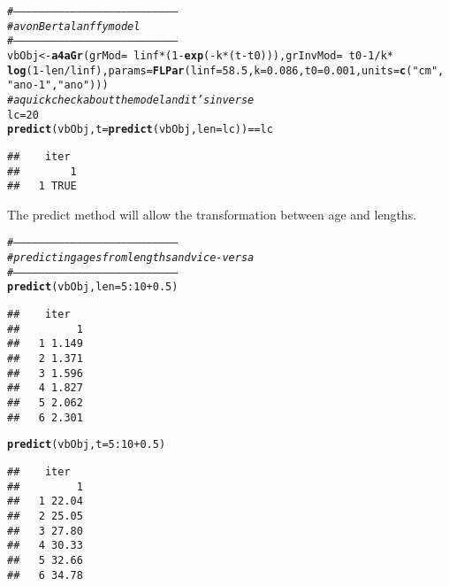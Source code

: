 \documentclass[a4paper,english,10pt]{article}\usepackage[]{graphicx}\usepackage[]{color}
\makeatletter
\newcommand{\hlnum}[1]{\textcolor[rgb]{0.686,0.059,0.569}{#1}}%
\newcommand{\hlstr}[1]{\textcolor[rgb]{0.192,0.494,0.8}{#1}}%
\newcommand{\hlcom}[1]{\textcolor[rgb]{0.678,0.584,0.686}{\textit{#1}}}%
\newcommand{\hlopt}[1]{\textcolor[rgb]{0,0,0}{#1}}%
\newcommand{\hlstd}[1]{\textcolor[rgb]{0.345,0.345,0.345}{#1}}%
\newcommand{\hlkwb}[1]{\textcolor[rgb]{0.69,0.353,0.396}{#1}}%
\newcommand{\hlkwc}[1]{\textcolor[rgb]{0.333,0.667,0.333}{#1}}%
\newcommand{\hlkwd}[1]{\textcolor[rgb]{0.737,0.353,0.396}{\textbf{#1}}}%
\newenvironment{kframe}{%
 \def\at@end@of@kframe{}%
 \ifinner\ifhmode%
  \def\at@end@of@kframe{\end{minipage}}%
  \begin{minipage}{\columnwidth}%
 \fi\fi%
 \def\FrameCommand##1{\hskip\@totalleftmargin \hskip-\fboxsep
 \colorbox{shadecolor}{##1}\hskip-\fboxsep
     \hskip-\linewidth \hskip-\@totalleftmargin \hskip\columnwidth}%
 \MakeFramed {\advance\hsize-\width
   \@totalleftmargin\z@ \linewidth\hsize
   \@setminipage}}%
 {\par\unskip\endMakeFramed%
 \at@end@of@kframe}
\newenvironment{knitrout}{}{} %
\makeatother
\begin{document}
\begin{knitrout}
\color{fgcolor}\begin{kframe}
\begin{alltt}
\hlcom{# ------------------------------------------------------------------------------}
\hlcom{# a von Bertalanffy model}
\hlcom{# ------------------------------------------------------------------------------}
\hlstd{vbObj} \hlkwb{<-} \hlkwd{a4aGr}\hlstd{(}\hlkwc{grMod} \hlstd{=} \hlopt{~}\hlstd{linf} \hlopt{*} \hlstd{(}\hlnum{1} \hlopt{-} \hlkwd{exp}\hlstd{(}\hlopt{-}\hlstd{k} \hlopt{*} \hlstd{(t} \hlopt{-} \hlstd{t0))),} \hlkwc{grInvMod} \hlstd{=} \hlopt{~}\hlstd{t0} \hlopt{-} \hlnum{1}\hlopt{/}\hlstd{k} \hlopt{*}
    \hlkwd{log}\hlstd{(}\hlnum{1} \hlopt{-} \hlstd{len}\hlopt{/}\hlstd{linf),} \hlkwc{params} \hlstd{=} \hlkwd{FLPar}\hlstd{(}\hlkwc{linf} \hlstd{=} \hlnum{58.5}\hlstd{,} \hlkwc{k} \hlstd{=} \hlnum{0.086}\hlstd{,} \hlkwc{t0} \hlstd{=} \hlnum{0.001}\hlstd{,} \hlkwc{units} \hlstd{=} \hlkwd{c}\hlstd{(}\hlstr{"cm"}\hlstd{,}
    \hlstr{"ano-1"}\hlstd{,} \hlstr{"ano"}\hlstd{)))}
\hlcom{# a quick check about the model and it's inverse}
\hlstd{lc} \hlkwb{=} \hlnum{20}
\hlkwd{predict}\hlstd{(vbObj,} \hlkwc{t} \hlstd{=} \hlkwd{predict}\hlstd{(vbObj,} \hlkwc{len} \hlstd{= lc))} \hlopt{==} \hlstd{lc}
\end{alltt}
\begin{verbatim}
##    iter
##        1
##   1 TRUE
\end{verbatim}
\end{kframe}
\end{knitrout}


The predict method will allow the transformation between age and lengths.

\begin{knitrout}
\color{fgcolor}\begin{kframe}
\begin{alltt}
\hlcom{# ------------------------------------------------------------------------------}
\hlcom{# predicting ages from lengths and vice-versa}
\hlcom{# ------------------------------------------------------------------------------}
\hlkwd{predict}\hlstd{(vbObj,} \hlkwc{len} \hlstd{=} \hlnum{5}\hlopt{:}\hlnum{10} \hlopt{+} \hlnum{0.5}\hlstd{)}
\end{alltt}
\begin{verbatim}
##    iter
##         1
##   1 1.149
##   2 1.371
##   3 1.596
##   4 1.827
##   5 2.062
##   6 2.301
\end{verbatim}
\begin{alltt}
\hlkwd{predict}\hlstd{(vbObj,} \hlkwc{t} \hlstd{=} \hlnum{5}\hlopt{:}\hlnum{10} \hlopt{+} \hlnum{0.5}\hlstd{)}
\end{alltt}
\begin{verbatim}
##    iter
##         1
##   1 22.04
##   2 25.05
##   3 27.80
##   4 30.33
##   5 32.66
##   6 34.78
\end{verbatim}
\end{kframe}
\end{knitrout}
\end{document}
